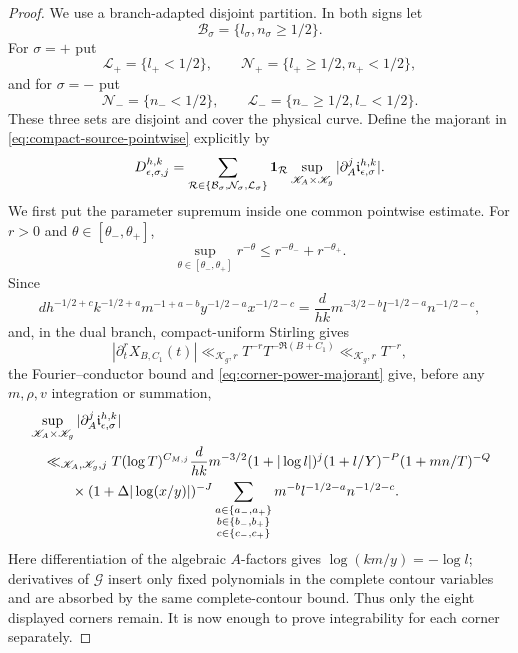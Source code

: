 \begin{proof}
We use a branch-adapted disjoint partition.  In both signs let
\[
 \mathcal B_\sigma=\{l_\sigma,n_\sigma\geq1/2\}.
\]
For $\sigma=+$ put
\[
 \mathcal L_+=\{l_+<1/2\},\qquad
 \mathcal N_+=\{l_+\geq1/2, n_+<1/2\},
\]
and for $\sigma=-$ put
\[
 \mathcal N_-=\{n_-<1/2\},\qquad
 \mathcal L_-=\{n_-\geq1/2, l_-<1/2\}.
\]
These three sets are disjoint and cover the physical curve.  Define the
majorant in \eqref{eq:compact-source-pointwise} explicitly by
\begin{equation}\label{eq:source-three-piece-dominator}
 D_{\epsilon,\sigma,j}^{h,k}
 =\sum_{\mathcal R\in\{\mathcal B_\sigma,
                         \mathcal N_\sigma,
                         \mathcal L_\sigma\}}
  {\bf1}_{\mathcal R}
  \sup_{\mathscr K_A\times\mathscr K_g}
 |\partial_A^j\mathfrak i_{\epsilon,\sigma}^{h,k}|.
\end{equation}
We first put the parameter supremum inside one common pointwise estimate.
For $r>0$ and $\theta\in[\theta_-,\theta_+]$,
\begin{equation}\label{eq:corner-power-majorant}
 \sup_{\theta\in[\theta_-,\theta_+]}r^{-\theta}
 \leq r^{-\theta_-}+r^{-\theta_+}.
\end{equation}
Since
\[
 d h^{-1/2+c}k^{-1/2+a}m^{-1+a-b}
 y^{-1/2-a}x^{-1/2-c}
 =\frac d{hk}m^{-3/2-b}l^{-1/2-a}n^{-1/2-c},
\]
and, in the dual branch, compact-uniform Stirling gives
\[
 |\partial_t^rX_{B,C_1}(t)|
 \ll_{\mathscr K_g,r}T^{-r}T^{-\Re(B+C_1)}
 \ll_{\mathscr K_g,r}T^{-r},
\]
the Fourier--conductor bound and \eqref{eq:corner-power-majorant} give,
before any $m,\rho,v$ integration or summation,
\begin{align}
 &\sup_{\mathscr K_A\times\mathscr K_g}
 |\partial_A^j\mathfrak i_{\epsilon,\sigma}^{h,k}|
 \notag\\
 &\quad\ll_{\mathscr K_A,\mathscr K_g,j}
 T(\log T)^{C_{M,j}}\frac d{hk}m^{-3/2}
 (1+|\log l|)^j
 (1+l/Y)^{-P}(1+mn/T)^{-Q}\notag\\
 &\qquad\quad\times
 (1+\Delta|\log(x/y)|)^{-J}
 \sum_{\substack{a\in\{a_-,a_+\}\\
                   b\in\{b_-,b_+\}\\
                   c\in\{c_-,c_+\}}}
 m^{-b}l^{-1/2-a}n^{-1/2-c}.
 \label{eq:source-corner-majorant}
\end{align}
Here differentiation of the algebraic $A$-factors gives
$\log(km/y)=-\log l$; derivatives of $\mathcal G$ insert only fixed
polynomials in the complete contour variables and are absorbed by the same
complete-contour bound.  Thus only the eight displayed corners remain.
It is now enough to prove integrability for each corner separately.


\end{proof}
